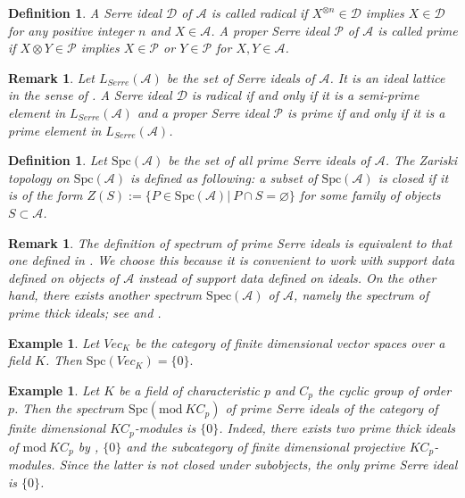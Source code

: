 \documentclass[11pt,a4paper]{amsart}
\numberwithin{equation}{section} \theoremstyle{plain}
\newtheorem{definition}[lem]{Definition}
\newtheorem{Ex}[lem]{Example}
\newtheorem{rem}[lem]{Remark}
\newenvironment{df}{\begin{definition}\rm}{\end{definition}}
\newenvironment{ex}{\begin{Ex}\rm}{\end{Ex}}
\begin{document}
\begin{df} A Serre ideal $\mathcal{D}$ of $\mathcal{A}$ is called radical if $X^{\otimes n}\in \mathcal{D}$ implies $X\in \mathcal{D}$ for any positive integer $n$ and $X\in \mathcal{A}$. A proper Serre ideal $\mathcal{P}$ of $\mathcal{A}$ is called prime if $X\otimes Y\in \mathcal{P}$ implies $X\in \mathcal{P}$ or $Y\in \mathcal{P}$ for $X,Y\in \mathcal{A}$.
\end{df}

\begin{rem}Let $L_{Serre}(\mathcal{A})$ be the set of Serre ideals of $\mathcal{A}$. It is an ideal lattice in the sense of \cite{BKS}.  A Serre ideal $\mathcal{D}$ is radical if and only if it is a semi-prime element in $L_{Serre}(\mathcal{A})$ and a proper Serre ideal $\mathcal{P}$ is prime if and only if it is a prime element in $L_{Serre}(\mathcal{A})$.
\end{rem}

\begin{df}Let $\mathrm{Spc}(\mathcal{A})$ be the set of all prime Serre ideals of $\mathcal{A}$. The Zariski topology on $\mathrm{Spc}(\mathcal{A})$ is defined as following: a subset of $\mathrm{Spc}(\mathcal{A})$ is closed if it is of the form $Z(S):=\{P\in \mathrm{Spc}(\mathcal{A})|~P\cap S=\varnothing \}$ for some family of objects $S\subset \mathcal{A}$.
\end{df}

\begin{rem} The definition of spectrum of prime Serre ideals is equivalent to that one defined in \cite[Section 7]{BKS}. We choose this  because it is convenient to work with support data defined on objects of $\mathcal{A}$ instead of support data defined on ideals. On the other hand, there exists another spectrum $\mathrm{Spec}(\mathcal{A})$ of $\mathcal{A}$, namely the spectrum of prime thick ideals; see \cite[Section 7]{Kra24} and \cite[Theorem 6.8]{B26}.
\end{rem}

\begin{ex}Let $Vec_{K}$ be the category of finite dimensional vector spaces over a field $K$. Then $\mathrm{Spc}(Vec_{K})=\{0\}.$
\end{ex}

\begin{ex}Let $K$ be a field of characteristic $p$ and $C_{p}$ the cyclic group of order $p$. Then the spectrum $\mathrm{Spc}(\mathrm{mod}~KC_{p})$ of prime Serre ideals of the category of finite dimensional $KC_{p}$-modules is $\{0\}$. Indeed, there exists two prime thick ideals of $\mathrm{mod}~KC_{p}$ by \cite[Example 17]{Kra24},  $\{0\}$ and  the subcategory of finite dimensional projective $KC_{p}$-modules. Since the latter is not closed under subobjects, the only prime Serre ideal is $\{0\}$.
\end{ex}
\end{document}
